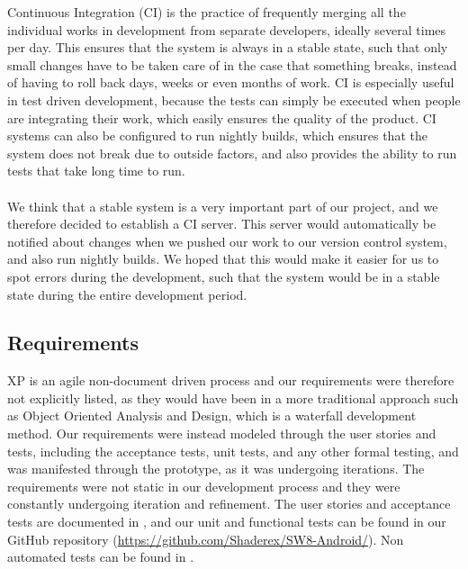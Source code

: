 Continuous Integration (CI) is the practice of frequently merging all the individual works in development from separate developers, ideally several times per day. This ensures that the system is always in a stable state, such that only small changes have to be taken care of in the case that something breaks, instead of having to roll back days, weeks or even months of work. CI is especially useful in test driven development, because the tests can simply be executed when people are integrating their work, which easily ensures the quality of the product. CI systems can also be configured to run nightly builds, which ensures that the system does not break due to outside factors, and also provides the ability to run tests that take long time to run.
\\\\
We think that a stable system is a very important part of our project, and we therefore decided to establish a CI server. This server would automatically be notified about changes when we pushed our work to our version control system, and also run nightly builds. We hoped that this would make it easier for us to spot errors during the development, such that the system would be in a stable state during the entire development period. 

\subsection{Requirements}

XP is an agile non-document driven process and our requirements were therefore not explicitly listed, as they would have been in a more traditional approach such as Object Oriented Analysis and Design, which is a waterfall development method. Our requirements were instead modeled through the user stories and tests, including the acceptance tests, unit tests, and any other formal testing, and was manifested through the prototype, as it was undergoing iterations. The requirements were not static in our development process and they were constantly undergoing iteration and refinement. The user stories and acceptance tests are documented in , and our unit and functional tests can be found in our GitHub repository (\href{https://github.com/Shaderex/SW8-Android/}{https://github.com/Shaderex/SW8-Android/}). Non automated tests can be found in .

